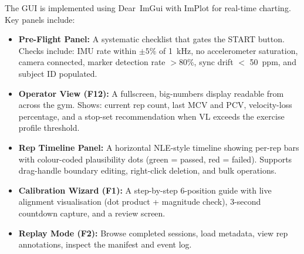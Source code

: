 The GUI is implemented using Dear~ImGui with ImPlot for real-time charting.
Key panels include:

\begin{itemize}[nosep]
  \item \textbf{Pre-Flight Panel:} A systematic checklist that gates the START button. Checks include: IMU rate within $\pm 5\%$ of \SI{1}{\kilo\hertz}, no accelerometer saturation, camera connected, marker detection rate $> 80\%$, sync drift $<$ \SI{50}{ppm}, and subject ID populated.
  \item \textbf{Operator View (F12):} A fullscreen, big-numbers display readable from across the gym. Shows: current rep count, last MCV and PCV, velocity-loss percentage, and a stop-set recommendation when VL exceeds the exercise profile threshold.
  \item \textbf{Rep Timeline Panel:} A horizontal NLE-style timeline showing per-rep bars with colour-coded plausibility dots (green = passed, red = failed). Supports drag-handle boundary editing, right-click deletion, and bulk operations.
  \item \textbf{Calibration Wizard (F1):} A step-by-step 6-position guide with live alignment visualisation (dot product + magnitude check), 3-second countdown capture, and a review screen.
  \item \textbf{Replay Mode (F2):} Browse completed sessions, load metadata, view rep annotations, inspect the manifest and event log.
\end{itemize}
